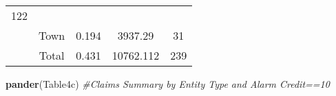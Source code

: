 \documentclass[]{book}
\newenvironment{Shaded}{\begin{snugshade}}{\end{snugshade}}
\newcommand{\KeywordTok}[1]{\textcolor[rgb]{0.13,0.29,0.53}{\textbf{#1}}}
\newcommand{\CommentTok}[1]{\textcolor[rgb]{0.56,0.35,0.01}{\textit{#1}}}
\newcommand{\NormalTok}[1]{#1}
\theoremstyle{definition}
\theoremstyle{definition}
\theoremstyle{definition}
\theoremstyle{remark}
\begin{document}
\begin{longtable}[]{@{}ccccc@{}}
\begin{minipage}[t]{0.14\columnwidth}
122\strut
\end{minipage}\tabularnewline
\begin{minipage}[t]{0.11\columnwidth}\centering\strut
\strut
\end{minipage} & \begin{minipage}[t]{0.12\columnwidth}\centering\strut
Town\strut
\end{minipage} & \begin{minipage}[t]{0.11\columnwidth}\centering\strut
0.194\strut
\end{minipage} & \begin{minipage}[t]{0.14\columnwidth}\centering\strut
3937.29\strut
\end{minipage} & \begin{minipage}[t]{0.14\columnwidth}\centering\strut
31\strut
\end{minipage}\tabularnewline
\begin{minipage}[t]{0.11\columnwidth}\centering\strut
\strut
\end{minipage} & \begin{minipage}[t]{0.12\columnwidth}\centering\strut
Total\strut
\end{minipage} & \begin{minipage}[t]{0.11\columnwidth}\centering\strut
0.431\strut
\end{minipage} & \begin{minipage}[t]{0.14\columnwidth}\centering\strut
10762.112\strut
\end{minipage} & \begin{minipage}[t]{0.14\columnwidth}\centering\strut
239\strut
\end{minipage}\tabularnewline
\bottomrule
\end{longtable}

\begin{Shaded}
\begin{Highlighting}[]
\KeywordTok{pander}\NormalTok{(Table4c) }\CommentTok{#Claims Summary by Entity Type and Alarm Credit==10}
\end{Highlighting}
\end{Shaded}
\end{document}
